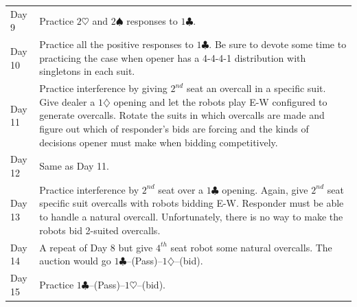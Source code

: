 \documentclass[a4paper,article,oneside]{memoir}
\begin{document}
\begin{longtable}{l|p{10cm}}
Day 9 & Practice $2\heartsuit$ and $2\spadesuit$ responses to $1\clubsuit$. \\
Day 10 & Practice all the positive responses to $1\clubsuit$. Be sure to devote some time to practicing the case when opener has a 4-4-4-1 distribution with singletons in each suit. \\
Day 11 & Practice interference by giving $2^{nd}$ seat an overcall in a specific suit. Give dealer a $1\diamondsuit$ opening and let the robots play E-W configured to generate overcalls. Rotate the suits in which overcalls are made and figure out which of responder's bids are forcing and the kinds of decisions opener must make when bidding competitively. \\
Day 12 & Same as Day 11. \\
Day 13 & Practice interference by $2^{nd}$ seat over a $1\clubsuit$ opening. Again, give $2^{nd}$ seat specific suit overcalls with robots bidding E-W. Responder must be able to handle a natural overcall. Unfortunately, there is no way to make the robots bid 2-suited overcalls. \\
Day 14 & A repeat of Day 8 but give $4^{th}$ seat robot some natural overcalls. The auction would go $1\clubsuit$--(Pass)--$1\diamondsuit$--(bid). \\
Day 15 & Practice $1\clubsuit$--(Pass)--$1\heartsuit$--(bid). \\
\hline
\end{longtable}
\end{document}
